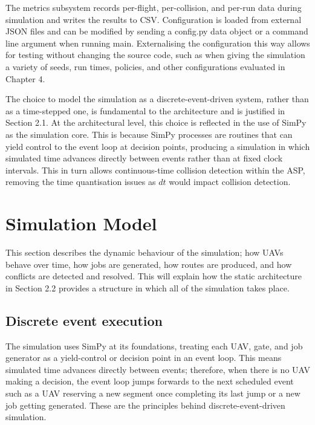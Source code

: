 \vspace{1em}

The metrics subsystem records per-flight, per-collision, and per-run data during simulation and writes the results to CSV. Configuration is loaded from external JSON files and can be modified by sending a config.py data object or a command line argument when running main. Externalising the configuration this way allows for testing without changing the source code, such as when giving the simulation a variety of seeds, run times, policies, and other configurations evaluated in Chapter 4. \par

\vspace{1em}

The choice to model the simulation as a discrete-event-driven system, rather than as a time-stepped one, is fundamental to the architecture and is justified in Section 2.1. At the architectural level, this choice is reflected in the use of SimPy as the simulation core. This is because SimPy processes are routines that can yield control to the event loop at decision points, producing a simulation in which simulated time advances directly between events rather than at fixed clock intervals. This in turn allows continuous-time collision detection within the ASP, removing the time quantisation issues as $dt$ would impact collision detection. \par

\vspace{1em}

\section{Simulation Model}

This section describes the dynamic behaviour of the simulation; how UAVs behave over time, how jobs are generated, how routes are produced, and how conflicts are detected and resolved. This will explain how the static architecture in Section 2.2 provides a structure in which all of the simulation takes place. \par

\vspace{1em}

\subsection{Discrete event execution}

The simulation uses SimPy at its foundations, treating each UAV, gate, and job generator as a yield-control or decision point in an event loop. This means simulated time advances directly between events; therefore, when there is no UAV making a decision, the event loop jumps forwards to the next scheduled event such as a UAV reserving a new segment once completing its last jump or a new job getting generated. These are the principles behind discrete-event-driven simulation.\par


